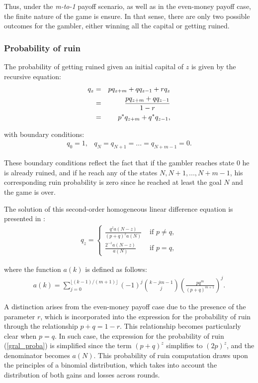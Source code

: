 \documentclass[11pt,twoside]{article}
\numberwithin{Theorem}{section}
\numberwithin{Definition}{section}
\numberwithin{Lemma}{section}
\numberwithin{Algorithm}{section}
\numberwithin{equation}{section}
\begin{document}
Thus, under the \textit{ m-to-1} payoff scenario, as well as in the even-money payoff case, the finite nature of the game is ensure. In that sense, there are only two possible outcomes for the gambler, either winning all the capital or getting ruined. 

\subsubsection{Probability of ruin}

The probability of getting ruined given an initial capital of $z$ is given by the recursive equation:
\begin{eqnarray}
q_{z} &=&  p  q_{z+m}+ q q_{z-1} +  rq_{z} \notag\\
&=&  \frac{p  q_{z+m}+ q q_{z-1}}{1-r} \notag\\
&=& p^{*}  q_{z+m}+ q^{*} q_{z-1}, 
\end{eqnarray}

with boundary conditions: 
\begin{eqnarray}
q_{0} = 1, & q_{N} =q_{N+1}=...= q_{N+m-1}= 0.
\end{eqnarray}

These boundary conditions reflect the fact that if the gambler reaches state $0$ he is already ruined, and if he reach any of the states $N, N+1, ..., N+m-1$, his corresponding ruin probability is zero since he reached at least the goal $N$ and the game is over.

The solution of this second-order homogeneous linear difference equation is presented in \cite{chances}: 
\begin{eqnarray}
q_{z} =  \left\{
\begin{array}{ll}
\frac{q^{z}a(N-z)}{(p+q)^{z}a(N)} & \text{ if } p\neq q,\\[10pt]
\frac{2^{-z}a(N-z)}{a(N)} & \text{ if } p= q, 
\end{array}
\right. 
\end{eqnarray}\label{gral_proba}

where the function $a(k)$ is defined as follows: 
\begin{eqnarray*}
a(k) = \sum_{j=0}^{\lfloor (k-1)/(m+1)\rfloor} (-1)^{j} \binom{k -jm -1}{j} \left(\frac{pq^{m}}{(p+q)^{m+1}}\right)^{j}.
\end{eqnarray*}

A distinction arises from the even-money payoff case due to the presence of the parameter $r$, which is incorporated into the expression for the probability of ruin through the relationship $p+q = 1-r$. This relationship becomes particularly clear when $p = q$. In such case, the expression for the probability of ruin (\ref{gral_proba}) is simplified since the term $(p+q)^z$ simplifies to $(2p)^z$, and the denominator becomes $a(N)$. This probability of ruin computation draws upon the principles of a binomial distribution, which takes into account the distribution of both gains and losses across rounds.
\end{document}
